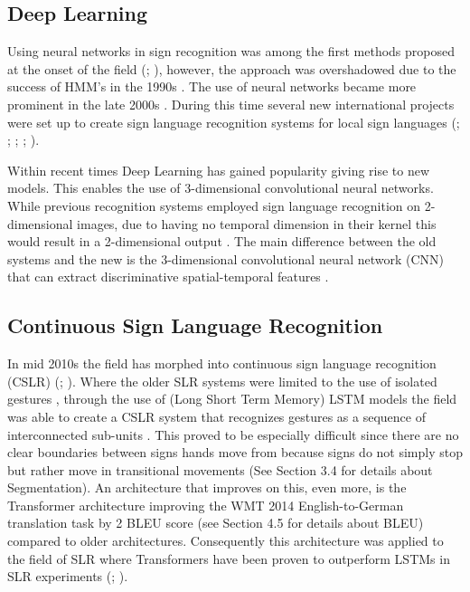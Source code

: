 \subsection{Deep Learning}

Using neural networks in sign recognition was among the first methods proposed at the onset of the field (\citealp{murakami1991gesture}; \citealp{fels1993glove}), however, the approach was overshadowed due to the success of HMM's in the 1990s \cite{cooper2011sign}. The use of neural networks became more prominent in the late 2000s \cite{parton2006sign}. During this time several new international projects were set up to create sign language recognition systems for local sign languages (\citealp{ethopia}; \citealp{malaysia}; \citealp{persia}; \citealp{brazil}; \citealp{arabia}).  

Within recent times Deep Learning \cite{lecun2015deep} has gained popularity giving rise to new models. This enables the use of 3-dimensional convolutional neural networks. While previous recognition systems employed sign language recognition on 2-dimensional images, due to having no temporal dimension in their kernel this would result in a 2-dimensional output \cite{tran2015learning}. The main difference between the old systems and the new is the 3-dimensional convolutional neural network (CNN) that can extract discriminative spatial-temporal features \cite{huang2015sign}.

\subsection{Continuous Sign Language Recognition}

In mid 2010s the field has morphed into continuous sign language recognition (CSLR) (\citealp{koller2015continuous}; \citealp{continuoussignlanguage}). Where the older SLR systems were limited to the use of isolated gestures \cite{cooper2011sign}, through the use of (Long Short Term Memory) LSTM models \cite{hochreiter1997long} the field was able to create a CSLR system that recognizes gestures as a sequence of interconnected sub-units \cite{mittal2019modified}. This proved to be especially difficult since there are no clear boundaries between signs hands move from because signs do not simply stop but rather move in transitional movements (See Section 3.4 for details about Segmentation). An architecture that improves on this, even more, is the Transformer architecture \cite{vaswani2017attention} improving the WMT 2014 English-to-German translation task by 2 BLEU score (see Section 4.5 for details about BLEU) compared to older architectures. Consequently this architecture was applied to the field of SLR where Transformers have been proven to outperform LSTMs in SLR experiments (\citealp{de2020sign}; \citealp{camgoz2020sign}).

